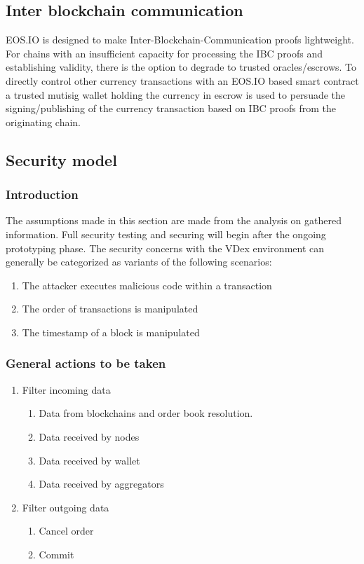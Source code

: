 \documentclass[]{article}
\begin{document}
\subsection{Inter blockchain communication}
EOS.IO is designed to make Inter-Blockchain-Communication proofs lightweight. 
For chains with an insufficient capacity for processing the  IBC proofs and establishing validity, 
there is the option to degrade to trusted oracles/escrows.
To directly control other currency transactions with an
EOS.IO based smart contract a trusted mutisig wallet holding the currency 
in escrow is used to persuade the signing/publishing of the currency 
transaction based on IBC proofs from the originating chain.	
\subsection{Security model}
\subsubsection{Introduction}
The assumptions made in this section are made from the analysis on gathered information. 
Full security testing and securing will begin after the ongoing prototyping phase. 
The security concerns with the VDex environment can generally be categorized as variants of the following scenarios:
	\begin{enumerate}
		\item The attacker executes malicious code within a transaction
		\item The order of transactions is manipulated
		\item The timestamp of a block is manipulated
	\end{enumerate}
	\subsubsection{General actions to be taken}
		\begin{enumerate}	
		\item{Filter incoming data} 
		\begin{enumerate}
			\item Data from blockchains and order book resolution.
			\item Data received by nodes
			\item Data received by wallet
			\item Data received by aggregators
		\end{enumerate}
		\item {Filter outgoing data}
		\begin{enumerate}
			\item Cancel order
			\item Commit
		\end{enumerate}
	\end{enumerate}
\end{document}

